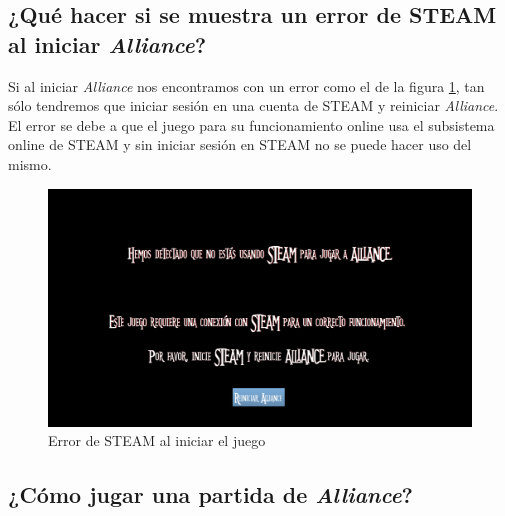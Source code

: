 \subsection{¿Qué hacer si se muestra un error de STEAM al iniciar \textit{Alliance}?}

Si al iniciar \textit{Alliance} nos encontramos con un error como el de la figura \ref{ErrorSteam}, tan sólo tendremos que iniciar sesión en una cuenta de STEAM y reiniciar \textit{Alliance}. El error se debe a que el juego para su funcionamiento online usa el subsistema online de STEAM y sin iniciar sesión en STEAM no se puede hacer uso del mismo.

\begin{figure}[H]
  \centering
  \includegraphics[width=12cm]{./images/ErrorSteam.png}
  \caption{Error de STEAM al iniciar el juego}
  \label{ErrorSteam}
\end{figure}


\subsection{¿Cómo jugar una partida de \textit{Alliance}?}

